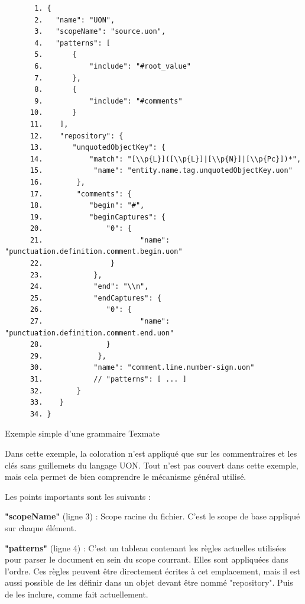 \documentclass[
    iict, %
    il, %
]{heig-tb}
\begin{document}
\begin{listing}[!ht]
    \begin{verbatim}
       1. {
       2.   "name": "UON",
       3.   "scopeName": "source.uon",
       4.   "patterns": [
       5.       {
       6.           "include": "#root_value"
       7.       },
       8.       {
       9.           "include": "#comments"
      10.       }
      11.    ],
      12.    "repository": {
      13.       "unquotedObjectKey": {
      14.           "match": "[\\p{L}]([\\p{L}]|[\\p{N}]|[\\p{Pc}])*",
      15.            "name": "entity.name.tag.unquotedObjectKey.uon"
      16.        },
      17.        "comments": {
      18.           "begin": "#",
      19.           "beginCaptures": {
      20.               "0": {
      21.                       "name": "punctuation.definition.comment.begin.uon"
      22.                }
      23.            },
      24.            "end": "\\n",
      25.            "endCaptures": {
      26.               "0": {
      27.                       "name": "punctuation.definition.comment.end.uon"
      28.               }
      29.             },
      30.            "name": "comment.line.number-sign.uon"
      31.            // "patterns": [ ... ]
      32.        }
      33.    }
      34. }
    \end{verbatim}
    \caption{Exemple simple d'une grammaire Texmate}
    \label{Textmate grammar}
\end{listing}

Dans cette exemple, la coloration n'est appliqué que sur les commentraires et les clés sans guillemets du langage UON.
Tout n'est pas couvert dans cette exemple, mais cela permet de bien comprendre le mécanisme général utilisé.

Les points importants sont les suivants :

\textbf{"scopeName"} (ligne 3) : Scope racine du fichier. C'est le scope de base appliqué sur chaque élément.

\textbf{"patterns"} (ligne 4) :
C'est un tableau contenant les règles actuelles utilisées pour parser le document en sein du scope courrant.
Elles sont appliquées dans l'ordre.
Ces règles peuvent être directement écrites à cet emplacement, mais il est aussi possible de les définir dans un objet devant être nommé "repository". Puis de les inclure, comme fait actuellement.
\end{document}
